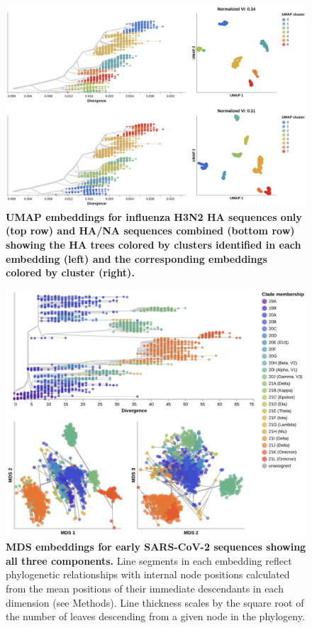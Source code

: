 \begin{figure}[!h]
\includegraphics[width=\columnwidth]{figures/flu-2016-2018-ha-na-umap-by-cluster.png}
\caption{{\bf UMAP embeddings for influenza H3N2 HA sequences only (top row) and HA/NA sequences combined (bottom row) showing the HA trees colored by clusters identified in each embedding (left) and the corresponding embeddings colored by cluster (right).}}\label{S_Fig_flu_ha_na_umap_embeddings}
\end{figure}

\begin{figure}[!h]
\includegraphics[width=\columnwidth]{figures/sarscov2-mds-by-Nextstrain_clade-clade.png}
\caption{{\bf MDS embeddings for early SARS-CoV-2 sequences showing all three components.}
  Line segments in each embedding reflect phylogenetic relationships with internal node positions calculated from the mean positions of their immediate descendants in each dimension (see Methods).
  Line thickness scales by the square root of the number of leaves descending from a given node in the phylogeny.}\label{S_Fig_sarscov2_early_mds}
\end{figure}

